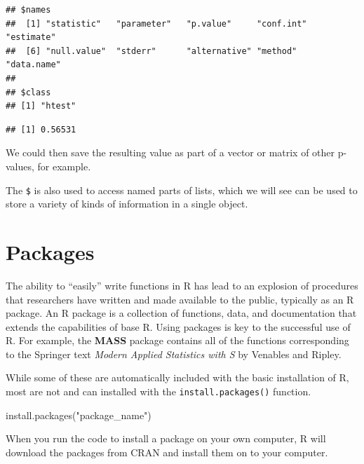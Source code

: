 \documentclass[
]{book}
\newenvironment{Shaded}{\begin{snugshade}}{\end{snugshade}}
\newcommand{\FunctionTok}[1]{\textcolor[rgb]{0.00,0.00,0.00}{#1}}
\newcommand{\NormalTok}[1]{#1}
\newcommand{\SpecialCharTok}[1]{\textcolor[rgb]{0.00,0.00,0.00}{#1}}
\newcommand{\StringTok}[1]{\textcolor[rgb]{0.31,0.60,0.02}{#1}}
\begin{document}
\begin{verbatim}
## $names
##  [1] "statistic"   "parameter"   "p.value"     "conf.int"    "estimate"   
##  [6] "null.value"  "stderr"      "alternative" "method"      "data.name"  
## 
## $class
## [1] "htest"
\end{verbatim}

\begin{Shaded}
\end{Shaded}

\begin{verbatim}
## [1] 0.56531
\end{verbatim}

We could then save the resulting value as part of a vector or matrix of other p-values, for example.

The \texttt{\$} is also used to access named parts of lists, which we will see can be used to store a variety of kinds of information in a single object.

\hypertarget{packages}{%
\section{Packages}\label{packages}}

The ability to ``easily'' write functions in R has lead to an explosion of procedures that researchers have written and made available to the public, typically as an R package. An R package is a collection of functions, data, and documentation that extends the capabilities of base R. Using packages is key to the successful use of R. For example, the \textbf{MASS} package contains all of the functions corresponding to the Springer text \emph{Modern Applied Statistics with S} by Venables and Ripley.

While some of these are automatically included with the basic installation of R, most are not and can installed with the \texttt{install.packages()} function.

\begin{Shaded}
\begin{Highlighting}[]
\FunctionTok{install.packages}\NormalTok{(}\StringTok{"package\_name"}\NormalTok{)}
\end{Highlighting}
\end{Shaded}

When you run the code to install a package on your own computer, R will download the packages from CRAN and install them on to your computer.
\end{document}

